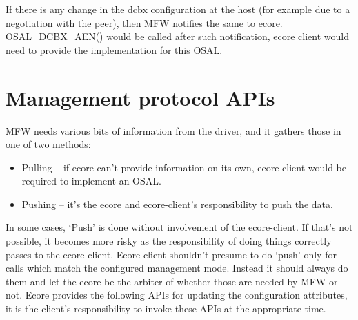 \documentclass[11pt,fleqn,hidelinks,oneside]{book} %
\newcommand{\insertcode}[2]{\begin{itemize}\item[]\end{itemize}} %
\newcommand{\ChapterFuncs}{}
\newcommand{\silentfunc}[1]
{\expandafter\def\expandafter\ChapterFuncs\expandafter{\ChapterFuncs { } \insertcode{snippets/#1_generated.h}{}}}
\begin{document}
If there is any change in the dcbx configuration at the host (for example due to a negotiation with the peer), then MFW notifies the same to ecore. OSAL\_DCBX\_AEN() would be called after such notification, ecore client would need to provide the implementation for this OSAL.

\section{Management protocol APIs}
\label{sec:mfw-protocols}
MFW needs various bits of information from the driver, and it gathers those in one of two methods:
\begin{itemize}
	\item Pulling – if ecore can’t provide information on its own, ecore-client would be required to implement an OSAL.\\
	\item Pushing – it’s the ecore and ecore-client’s responsibility to push the data.\\
\end{itemize}
In some cases, ‘Push’ is done without involvement of the ecore-client. If that’s not possible, it becomes more risky as the responsibility of doing things correctly passes to the ecore-client. Ecore-client shouldn’t presume to do ‘push’ only for calls which match the configured management mode. Instead it should always do them and let the ecore be the arbiter of whether those are needed by MFW or not. Ecore provides the following APIs for updating the configuration attributes, it is the client's responsibility to invoke these APIs at the appropriate time.
\silentfunc{mcp_ov_update_current_config}
\silentfunc{mcp_ov_update_mtu}
\silentfunc{mcp_ov_update_mac}
\silentfunc{mcp_ov_update_wol}
\silentfunc{mcp_ov_update_driver_state}
\silentfunc{mcp_update_fcoe_cvid}
\silentfunc{mcp_update_fcoe_fabric_name}
\end{document}
